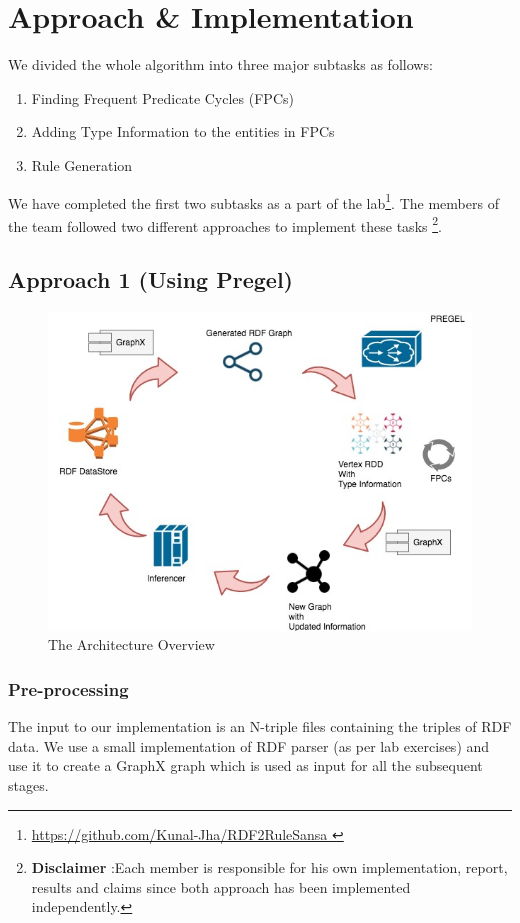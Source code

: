 \documentclass{easychair}
\begin{document}
\section{Approach \& Implementation}


We divided the whole algorithm into three major subtasks as follows: 
\begin{enumerate}
\item Finding Frequent Predicate Cycles (FPCs)
\item Adding Type Information to the entities in FPCs
\item Rule Generation 
\end{enumerate}
We have completed the first two subtasks as a part of the lab\footnote{\url{ https://github.com/Kunal-Jha/RDF2RuleSansa }}. The members of the team followed two different approaches to implement these tasks \footnote{\textbf{Disclaimer} :Each member is responsible for his own implementation, report, results and claims since both approach has been implemented independently.}. 
\subsection{Approach 1 (Using Pregel)}
\begin{figure}[tb]
	\begin{centering}
	\includegraphics[width=1\textwidth]{RDf2Rule.jpg}
	\caption{The Architecture Overview}
	\label{fig:architecture}
	\end{centering}
\end{figure} 

\subsubsection{Pre-processing}
The input to our implementation is an N-triple files containing the triples of RDF data.  We use a small implementation of RDF parser (as per lab exercises) and use it to create a GraphX graph which is used as input for all the subsequent stages. 
\end{document}
